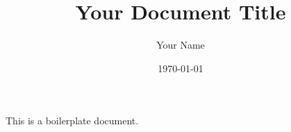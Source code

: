 \documentclass[12pt, letterpaper]{article}
\title{Your Document Title}
\author{Your Name}
\date{\today} %
\begin{document}
\maketitle

This is a boilerplate document.
\end{document}

